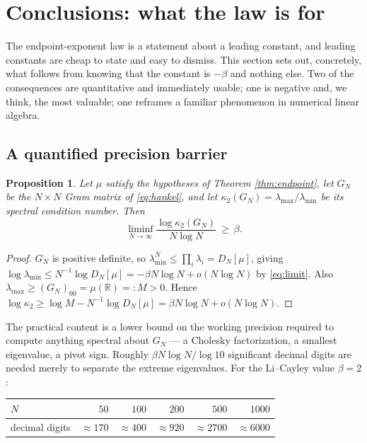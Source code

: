 \documentclass[11pt]{amsart}
\numberwithin{equation}{section}
\theoremstyle{plain}
\newtheorem{proposition}[theorem]{Proposition}
\theoremstyle{definition}
\theoremstyle{remark}
\begin{document}
\section{Conclusions: what the law is for}
\label{sec:conclusions}

The endpoint-exponent law is a statement about a leading constant, and leading constants are cheap
to state and easy to dismiss. This section sets out, concretely, what follows from knowing that the
constant is $-\beta$ and nothing else. Two of the consequences are quantitative and immediately
usable; one is negative and, we think, the most valuable; one reframes a familiar phenomenon in
numerical linear algebra.

\subsection{A quantified precision barrier}
\label{ss:conditioning}

\begin{proposition}
\label{prop:kappa}
Let $\mu$ satisfy the hypotheses of Theorem \ref{thm:endpoint}, let $G_{N}$ be the $N\times N$ Gram
matrix of \eqref{eq:hankel}, and let $\kappa_{2}(G_{N})=\lambda_{\max}/\lambda_{\min}$ be its
spectral condition number. Then
\begin{equation}
\liminf_{N\to\infty}\frac{\log\kappa_{2}(G_{N})}{N\log N}\ \ge\ \beta .
\label{eq:kappa}
\end{equation}
\end{proposition}

\begin{proof}
$G_{N}$ is positive definite, so $\lambda_{\min}^{N}\le\prod_{i}\lambda_{i}=D_{N}[\mu]$, giving
$\log\lambda_{\min}\le N^{-1}\log D_{N}[\mu]=-\beta N\log N+o(N\log N)$ by \eqref{eq:limit}.
Also $\lambda_{\max}\ge(G_{N})_{00}=\mu(\mathbb R)=:M>0$. Hence
$\log\kappa_{2}\ge\log M-N^{-1}\log D_{N}[\mu]=\beta N\log N+o(N\log N)$.
\end{proof}

The practical content is a lower bound on the working precision required to compute anything
spectral about $G_{N}$ --- a Cholesky factorization, a smallest eigenvalue, a pivot sign. Roughly
$\beta N\log N/\log10$ significant decimal digits are needed merely to separate the extreme
eigenvalues. For the Li--Cayley value $\beta=2$:

\begin{center}
\begin{tabular}{lrrrrr}
\toprule
$N$ & $50$ & $100$ & $200$ & $500$ & $1000$\\
\midrule
decimal digits & $\approx170$ & $\approx400$ & $\approx920$ & $\approx2700$ & $\approx6000$\\
\bottomrule
\end{tabular}
\end{center}
\end{document}
